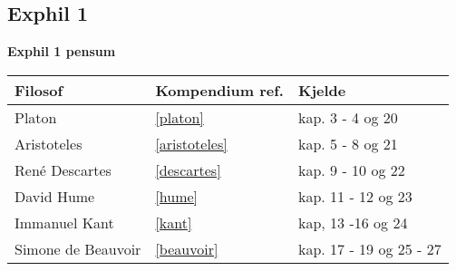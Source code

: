 \documentclass[a4paper]{IEEEtran}
\begin{document}
\subsection{Exphil 1}\bigskip
\begin{center}

\textbf{Exphil 1 pensum}\bigskip

\begin{tabularx}{0.75\textwidth}{| X | X | X |}\hline	
            Filosof
            &
            Kompendium ref.
            &
            Kjelde \\ \hline
            Platon 
            &
            \ref{platon}
            &
            kap. 3 - 4 og 20
            \\ \hline
            Aristoteles 
            &
            \ref{aristoteles}
            &
            kap. 5 - 8 og 21
            \\ \hline
            René Descartes 
            &
            \ref{descartes}
            &
            kap. 9 - 10 og 22
            \\ \hline
            David Hume 
            &
            \ref{hume}
            &
            kap. 11 - 12 og 23
            \\ \hline
            Immanuel Kant 
            &
            \ref{kant}
            & 
            kap, 13 -16 og 24
            \\ \hline
            Simone de Beauvoir 
            &
            \ref{beauvoir}
            & 
            kap. 17 - 19 og 25 - 27
            \\ \hline
    \end{tabularx}
\end{center}
\end{document}
